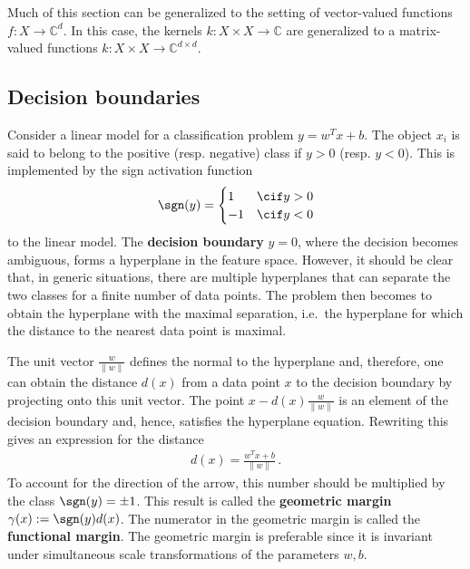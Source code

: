     \begin{remark}
        Much of this section can be generalized to the setting of vector-valued functions $f:X\rightarrow\mathbb{C}^d$. In this case, the kernels $k:X\times X\rightarrow\mathbb{C}$ are generalized to a matrix-valued functions $k:X\times X\rightarrow\mathbb{C}^{d\times d}$.
    \end{remark}

\subsection{Decision boundaries}

    Consider a linear model for a classification problem $y = w^Tx + b$. The object $x_i$ is said to belong to the positive (resp. negative) class if $y>0$ (resp. $y<0$). This is implemented by the sign activation function
    \begin{gather}
        \sgn(y) =
        \begin{cases}
            1&\cif y>0\\
            -1&\cif y<0
        \end{cases}
    \end{gather}
    to the linear model. The \textbf{decision boundary} $y=0$, where the decision becomes ambiguous, forms a hyperplane in the feature space. However, it should be clear that, in generic situations, there are multiple hyperplanes that can separate the two classes for a finite number of data points. The problem then becomes to obtain the hyperplane with the maximal separation, i.e.~the hyperplane for which the distance to the nearest data point is maximal.

    The unit vector $\frac{w}{\|w\|}$ defines the normal to the hyperplane and, therefore, one can obtain the distance $d(x)$ from a data point $x$ to the decision boundary by projecting onto this unit vector. The point $x - d(x)\frac{w}{\|w\|}$ is an element of the decision boundary and, hence, satisfies the hyperplane equation. Rewriting this gives an expression for the distance
    \begin{gather}
        d(x) = \frac{w^Tx + b}{\|w\|}\,.
    \end{gather}
    To account for the direction of the arrow, this number should be multiplied by the class $\sgn(y)=\pm1$. This result is called the \textbf{geometric margin} $\gamma(x):=\sgn(y)d(x)$. The numerator in the geometric margin is called the \textbf{functional margin}. The geometric margin is preferable since it is invariant under simultaneous scale transformations of the parameters $w,b$.

